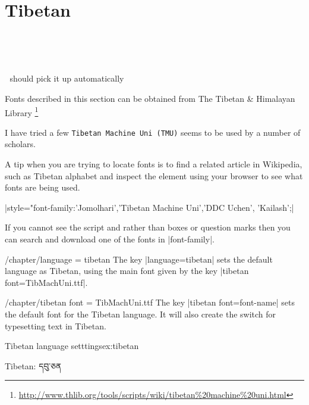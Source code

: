 \section{Tibetan}

^^A\newfontfamily{}

^^A\newfontfamily{}

^^A should pick it up automatically \tibetan

Fonts described in this section can be obtained from The Tibetan \& Himalayan Library
\footnote{\url{http://www.thlib.org/tools/scripts/wiki/tibetan%20machine%20uni.html}  }

I have tried a few \texttt{Tibetan Machine Uni (TMU)} seems to be used by a number of scholars. 

A tip when you are trying to locate fonts is to find a related article in Wikipedia, such as Tibetan alphabet and inspect the element using your browser to see what fonts are being used.


|style="font-family:'Jomolhari','Tibetan Machine Uni','DDC Uchen', 'Kailash';| 


If you cannot see the script and rather than boxes or question marks then you can search and download one of the fonts in |font-family|.

\def\tibetandefaultfont#1{\newfontfamily\tibetan[Language=Tibetan]{#1}}

\cxset{tibetan font/.code=\tibetandefaultfont{#1}}






\begin{key}{/chapter/language = tibetan} The key |language=tibetan| sets the default language as Tibetan, using the main font given by the key |tibetan font=TibMachUni.ttf|.
\end{key}

\begin{key}{/chapter/tibetan font = TibMachUni.ttf} The key |tibetan font=font-name| sets the default font for the Tibetan language. It will also create the switch \cmd{\tibetan} for typesetting text in Tibetan.
\end{key}

\begin{texexample}{Tibetan language setttings}{ex:tibetan}
\tibetan

\tibetan Tibetan: དབུ་ཅན
\end{texexample}


